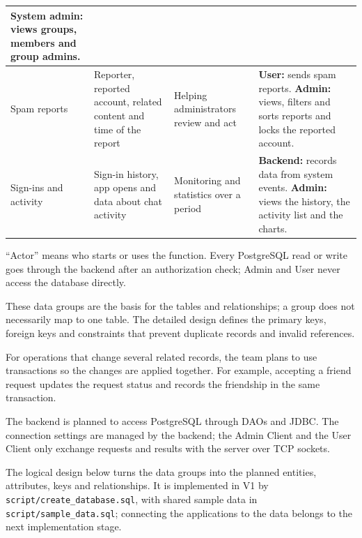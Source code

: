 \begin{longtable}{|L{2cm}|L{4cm}|L{3cm}|L{\dimexpr\textwidth-9cm-8\arrayrulewidth\relax}|}
  \textbf{System admin:} views groups, members and group admins.\\
  \hline
  Spam reports &
  Reporter, reported account, related content and time of the report &
  Helping administrators review and act &
  \textbf{User:} sends spam reports.
  \textbf{Admin:} views, filters and sorts reports and locks the reported account.\\
  \hline
  Sign-ins and activity &
  Sign-in history, app opens and data about chat activity &
  Monitoring and statistics over a period &
  \textbf{Backend:} records data from system events.
  \textbf{Admin:} views the history, the activity list and the charts.\\
  \hline
\end{longtable}
\endgroup

``Actor'' means who starts or uses the function. Every PostgreSQL read or write goes
through the backend after an authorization check; Admin and User never access the
database directly.

These data groups are the basis for the tables and relationships; a group does not
necessarily map to one table. The detailed design defines the primary keys, foreign
keys and constraints that prevent duplicate records and invalid references.

For operations that change several related records, the team plans to use
transactions so the changes are applied together. For example, accepting a friend
request updates the request status and records the friendship in the same
transaction.

The backend is planned to access PostgreSQL through DAOs and JDBC. The connection
settings are managed by the backend; the Admin Client and the User Client only
exchange requests and results with the server over TCP sockets.

The logical design below turns the data groups into the planned entities,
attributes, keys and relationships. It is implemented in V1 by
\texttt{script/create\_database.sql}, with shared sample data in
\texttt{script/sample\_data.sql}; connecting the applications to the data belongs
to the next implementation stage.




